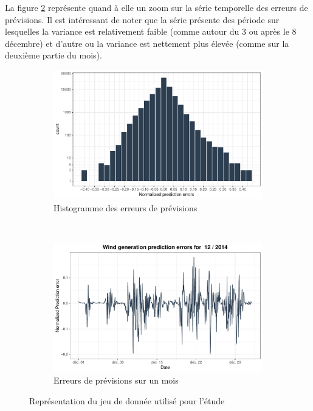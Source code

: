 \documentclass[12pt]{report}
\begin{document}
La figure \ref{fig::Data_Eolien_BPA_NormWindErrs_1Month} représente quand à elle un zoom sur la série temporelle des erreurs de prévisions. Il est intéressant de noter que la série présente des période sur lesquelles la variance est relativement faible (comme autour du 3 ou après le 8 décembre) et d'autre ou la variance est nettement plus élevée (comme sur la deuxième partie du mois).

\begin{figure}[ht!]
	\begin{center}
		\begin{subfigure}[b]{0.45\textwidth}
			\includegraphics[width=\textwidth]{Images/Data/Eolien/BPA/Hist_NormErr.pdf}
			\caption{Histogramme des erreurs de prévisions}
			\label{fig::Data_Eolien_BPA_HistNormERR}
		\end{subfigure}
		~
		\begin{subfigure}[b]{0.45\textwidth}
			\includegraphics[width=\textwidth]{Images/Data/Eolien/BPA/NormWindErrs_1Month.pdf}
			\caption{Erreurs de prévisions sur un mois}
			\label{fig::Data_Eolien_BPA_NormWindErrs_1Month}
		\end{subfigure}
		\caption{Représentation du jeu de donnée utilisé pour l'étude}
		\label{fig::Data_BPA_HitsZoom}	
	\end{center}
\end{figure}
\end{document}
